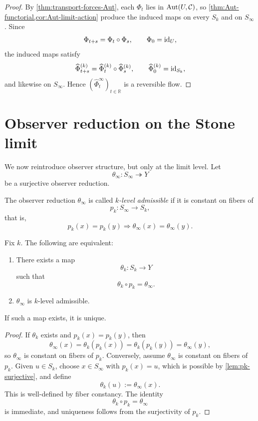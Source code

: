 \begin{proof}
	By \cref{thm:transport-forces-Aut}, each \(\Phi_t\) lies in
	\(\operatorname{Aut}(U,\mathcal C)\), so
	\cref{thm:Aut-functorial,cor:Aut-limit-action} produce the induced
	maps on every \(S_k\) and on \(S_\infty\).  Since
	\[
		\Phi_{t+s}=\Phi_t\circ\Phi_s,
		\qquad
		\Phi_0=\operatorname{id}_U,
	\]
	the induced maps satisfy
	\[
		\widehat\Phi_{t+s}^{(k)}
		=
		\widehat\Phi_t^{(k)}\circ\widehat\Phi_s^{(k)},
		\qquad
		\widehat\Phi_0^{(k)}=\operatorname{id}_{S_k},
	\]
	and likewise on \(S_\infty\).  Hence
	\((\widehat\Phi_t^\infty)_{t\in\mathbb R}\) is a reversible flow.
\end{proof}
\section{Observer reduction on the Stone limit}
We now reintroduce observer structure, but only at the limit level.
Let
\[
	\theta_\infty\colon S_\infty\twoheadrightarrow Y
\]
be a surjective observer reduction.
\begin{definition}
	The observer reduction \(\theta_\infty\) is called
	\emph{\(k\)-level admissible} if it is constant on fibers of
	\[
		p_k\colon S_\infty\to S_k,
	\]
	that is,
	\[
		p_k(x)=p_k(y)
		\Longrightarrow
		\theta_\infty(x)=\theta_\infty(y).
	\]
\end{definition}
\begin{lemma}
	\label{lem:descent-criterion}
	Fix \(k\).  The following are equivalent:
	\begin{enumerate}[label=\textup{(\roman*)}]
		\item
		      There exists a map
		      \[
			      \theta_k\colon S_k\to Y
		      \]
		      such that
		      \[
			      \theta_k\circ p_k=\theta_\infty.
		      \]
		\item
		      \(\theta_\infty\) is \(k\)-level admissible.
	\end{enumerate}
	If such a map exists, it is unique.
\end{lemma}
\begin{proof}
	If \(\theta_k\) exists and \(p_k(x)=p_k(y)\), then
	\[
		\theta_\infty(x)=\theta_k(p_k(x))=\theta_k(p_k(y))=\theta_\infty(y),
	\]
	so \(\theta_\infty\) is constant on fibers of \(p_k\).
	Conversely, assume \(\theta_\infty\) is constant on fibers of \(p_k\).
	Given \(u\in S_k\), choose \(x\in S_\infty\) with \(p_k(x)=u\), which
	is possible by \cref{lem:pk-surjective}, and define
	\[
		\theta_k(u):=\theta_\infty(x).
	\]
	This is well-defined by fiber constancy.  The identity
	\[
		\theta_k\circ p_k=\theta_\infty
	\]
	is immediate, and uniqueness follows from the surjectivity of \(p_k\).
\end{proof}
